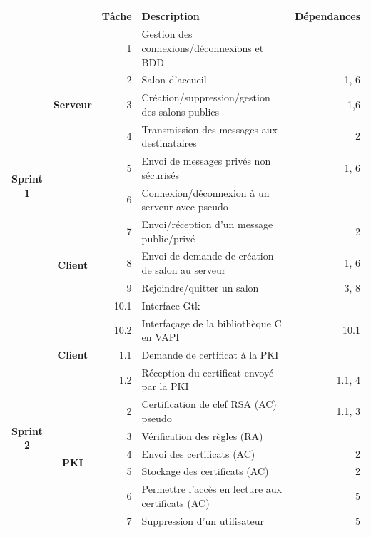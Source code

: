 \documentclass[a4paper,11pt,french]{article}
\begin{document}
\begin{tabular}{|c|c|r|l|r|}
\hline
&&\textbf{Tâche} & \textbf{Description} & \textbf{Dépendances}\\
\hline
\multirow{11}{*}{\begin{sideways}\textbf{Sprint 1}\end{sideways}}&\multirow{5}{*}{\begin{sideways}\textbf{Serveur}\end{sideways}}&1& Gestion des connexions/déconnexions et BDD&\\
&& 2 & Salon d'accueil&1, 6\\
&& 3 & Création/suppression/gestion des salons publics & 1,6\\
&& 4 & Transmission des messages aux destinataires & 2\\
&& 5 & Envoi de messages privés non sécurisés& 1, 6\\
\cline{2-5}
&\multirow{6}{*}{\begin{sideways}\textbf{Client}\end{sideways}}& 6 & Connexion/déconnexion à un serveur avec pseudo&\\
&& 7 & Envoi/réception d'un message public/privé & 2\\
&& 8 &Envoi de demande de création de salon au serveur & 1, 6\\
&& 9 &Rejoindre/quitter un salon & 3, 8\\
&& 10.1 &Interface Gtk & \\
&& 10.2 &Interfaçage de la bibliothèque C en VAPI & 10.1\\
\hline

\multirow{8}{*}{\begin{sideways}\textbf{Sprint 2}\end{sideways}}&\textbf{Client}&1.1& Demande de certificat à la PKI &\\
&&1.2& Réception du certificat envoyé par la PKI & 1.1, 4\\
\cline{2-5}
&\multirow{6}{*}{\begin{sideways}\textbf{PKI}\end{sideways}}& 2 & Certification de clef RSA (AC)
 pseudo & 1.1, 3\\
&& 3 & Vérification des règles (RA) &\\
&& 4 & Envoi des certificats (AC) & 2\\
&& 5 & Stockage des certificats (AC)& 2\\
&& 6 & Permettre l'accès en lecture aux certificats (AC) & 5\\
&& 7 & Suppression d'un utilisateur & 5\\
\hline


\end{tabular}
\end{document}
